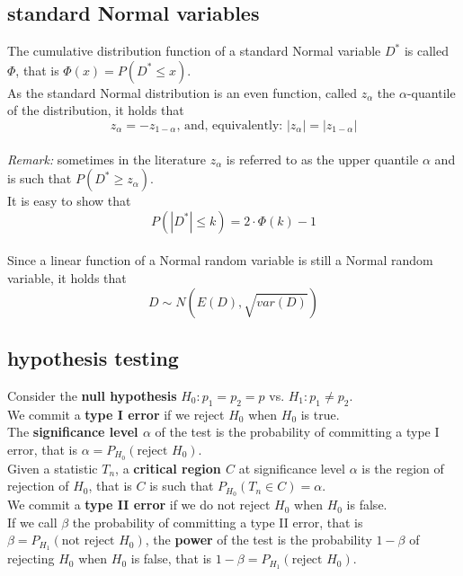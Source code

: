 \documentclass[14pt]{article}
\begin{document}
\subsection{standard Normal variables}
The cumulative distribution function of a standard Normal variable $D^{*}$ is called $\Phi$, that is $\Phi (x)=P(D^{*}\leq x)$.\\
\newline
As the standard Normal distribution is an even function, called $z_{\alpha}$ the $\alpha$-quantile of the distribution, it holds that  \\
\begin{equation}\label{eq: zalfa}
z_{\alpha}=-z_{1-\alpha} \text{, and, equivalently: } \left |z_{\alpha}\right |=\left |z_{1-\alpha} \right |
\end{equation}\\
\textit{Remark: } sometimes in the literature $z_{\alpha} $ is referred to as the upper quantile 
$\alpha$ and is such that $P(D^{*}\geq z_{\alpha}).$\\
It is  easy to show that 
\begin{equation}\label{eq: 2 fi minus 1}
P \left ( \left | D^{*} \right| \leq k \right )=2\cdot \Phi (k) -1
\end{equation}\\
Since a linear function of a Normal random variable is still a Normal random variable, it  holds that
\begin{equation}
D\sim N\left (E(D),\sqrt{var(D)} \right )
\end{equation}

\subsection{hypothesis testing}

Consider the \textbf{null hypothesis} $H_{0}: p_{1}=p_{2}=p$ vs. $H_{1}: p_{1}\neq p_{2}$. \\
\newline
We commit a \textbf{type I error} if we reject $H_{0}$ when  $H_{0}$ is true.\\
\newline
The \textbf{significance level $\alpha$} of the test is the probability of committing a type I error, that is $\alpha=P_{H_{0}} \left (\text{reject } H_{0} \right)$.\\
\newline
Given a statistic $T_{n}$, a \textbf {critical region $C$} at significance level $\alpha$ is the region of rejection of $H_{0}$, that is $C$ is such that  $P_{H_{0}}(T_{n}\in C)=\alpha$.\\
\newline
We commit a \textbf{type II error} if we do not reject $H_{0}$ when  $H_{0}$ is false.\\
\newline
If we call $\beta$ the probability of  committing a type II error, that is 
$ \beta= P_{H_{1}}  \left ( \text{not reject } H_{0} \right )$, 
 the \textbf{power} of the test is the probability $1-\beta$ of rejecting $H_{0}$ when  $H_{0}$ is false, that is  $1-\beta=P_{H_{1}} \left (\text{reject } H_{0}\right)$. 
\end{document}

